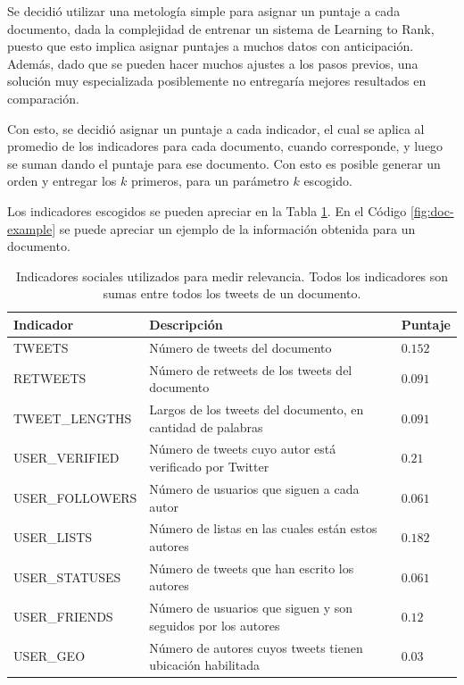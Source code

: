 \documentclass[upright, contnum]{umemoria}
\begin{document}
    Se decidió utilizar una metología simple para asignar un puntaje a
    cada documento, dada la complejidad de entrenar un sistema de
    Learning to Rank, puesto que esto implica asignar puntajes a muchos datos con
    anticipación. Además, dado que se pueden hacer muchos ajustes a los
    pasos previos, una solución muy especializada posiblemente no
    entregaría mejores resultados en comparación.
    
    Con esto, se decidió asignar un puntaje a cada indicador, el cual se aplica
    al promedio de los indicadores para cada documento, cuando
    corresponde, y luego se suman dando el puntaje para ese
    documento. Con esto es posible generar un orden y entregar los $k$
    primeros, para un parámetro $k$ escogido.

    Los indicadores escogidos se pueden apreciar en la Tabla
    \ref{tbl:indicadores}. En el Código \ref{fig:doc-example} se puede
    apreciar un ejemplo de la información obtenida para un documento.




\begin{table}[htb]
\begin{center}
\begin{tabular}{|l|l|l|}
\hline
 Indicador        &  Descripción                                                   &  Puntaje  \\
\hline
\hline
 TWEETS           &  Número de tweets del documento                                &  $0.152$  \\
 RETWEETS         &  Número de retweets de los tweets del documento                &  $0.091$  \\
 TWEET\_LENGTHS   &  Largos de los tweets del documento, en cantidad de palabras   &  $0.091$  \\
 USER\_VERIFIED   &  Número de tweets cuyo autor está verificado por Twitter       &  $0.21$   \\
 USER\_FOLLOWERS  &  Número de usuarios que siguen a cada autor                    &  $0.061$  \\
 USER\_LISTS      &  Número de listas en las cuales están estos autores            &  $0.182$  \\
 USER\_STATUSES   &  Número de tweets que han escrito los autores                  &  $0.061$  \\
 USER\_FRIENDS    &  Número de usuarios que siguen y son seguidos por los autores  &  $0.12$   \\
 USER\_GEO        &  Número de autores cuyos tweets tienen ubicación habilitada    &  $0.03$   \\
\hline
\end{tabular}
\end{center}
\caption{\label{tbl:indicadores}Indicadores sociales utilizados para medir relevancia. Todos los indicadores son sumas entre todos los tweets de un documento.}
\end{table}
\end{document}
